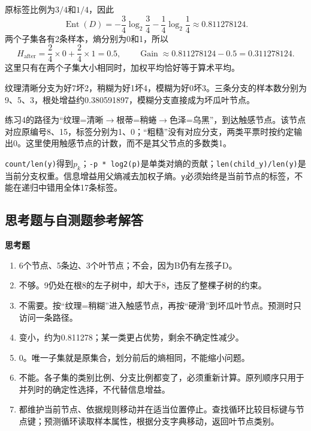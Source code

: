 \documentclass[UTF8,a4paper,11pt,fontset=fandol]{ctexart}
\numberwithin{equation}{subsection}
\begin{document}
\begin{examplebox}[练习2：加权减少量]
原标签比例为$3/4$和$1/4$，因此
\begin{equation}
\operatorname{Ent}(D)
=-\frac34\log_2\frac34-\frac14\log_2\frac14
\approx0.811278124.
\end{equation}
两个子集各有2条样本，熵分别为0和1，所以
\begin{equation}
H_{\mathrm{after}}=\frac24\times0+\frac24\times1=0.5,\qquad
\operatorname{Gain}\approx0.811278124-0.5=0.311278124.
\end{equation}
这里只有在两个子集大小相同时，加权平均恰好等于算术平均。
\end{examplebox}

\begin{examplebox}[练习3与4：回到真实数据]
纹理清晰分支为好7坏2，稍糊为好1坏4，模糊为好0坏3。三条分支的样本数分别为9、5、3，根处增益约0.380591897，模糊分支直接成为坏瓜叶节点。

练习4的路径为“纹理=清晰$\to$根蒂=稍蜷$\to$色泽=乌黑”，到达触感节点。该节点对应原编号8、15，标签分别为1、0；“粗糙”没有对应分支，两类平票时按约定输出0。这里使用触感节点的计数，而不是其父节点的多数类1。
\end{examplebox}

\begin{keybox}[练习5：公式与语句的映射]
\texttt{count/len(y)}得到$p_k$；\texttt{-p * log2(p)}是单类对熵的贡献；\texttt{len(child\_y)/len(y)}是当前分支权重。信息增益用父熵减去加权子熵。\texttt{y}必须始终是当前节点的标签，不能在递归中错用全体17条标签。
\end{keybox}

\clearpage
\clearpage
\subsection{思考题与自测题参考解答}
\textbf{思考题}
\begin{enumerate}
\item 6个节点、5条边、3个叶节点；不会，因为B仍有左孩子D。
\item 不够。9仍处在根8的左子树中，却大于8，违反了整棵子树的约束。
\item 不需要。按“纹理=稍糊”进入触感节点，再按“硬滑”到坏瓜叶节点。预测时只访问一条路径。
\item 变小，约为0.811278；某一类更占优势，剩余不确定性减少。
\item 0。唯一子集就是原集合，划分前后的熵相同，不能缩小问题。
\item 不能。各子集的类别比例、分支比例都变了，必须重新计算。原列顺序只用于并列时的确定性选择，不代替信息增益。
\item 都维护当前节点、依据规则移动并在适当位置停止。查找循环比较目标键与节点键；预测循环读取样本属性，根据分支字典移动，返回叶节点类别。
\end{enumerate}
\end{document}
